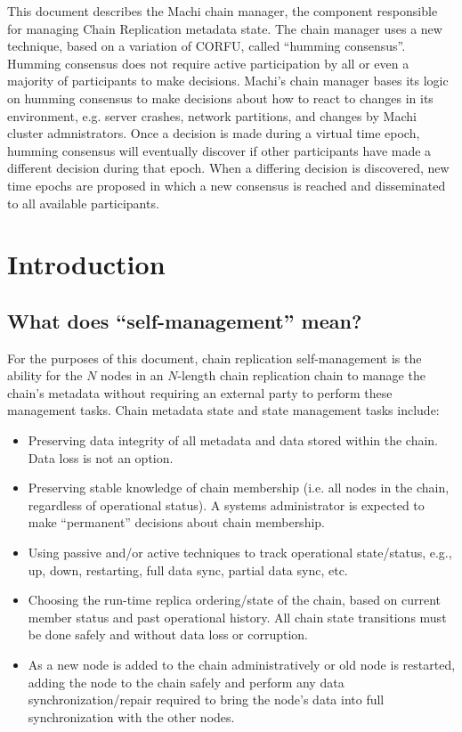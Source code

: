 \documentclass[preprint,10pt]{sigplanconf}
\begin{document}
This document describes the Machi chain manager, the component
responsible for managing Chain Replication metadata state.  The chain
manager uses a new technique, based on a variation of CORFU, called
``humming consensus''.
Humming consensus does not require active participation by all or even
a majority of participants to make decisions.  Machi's chain manager
bases its logic on humming consensus to make decisions about how to
react to changes in its environment, e.g. server crashes, network
partitions, and changes by Machi cluster admnistrators.  Once a
decision is made during a virtual time epoch, humming consensus will
eventually discover if other participants have made a different
decision during that epoch.  When a differing decision is discovered,
new time epochs are proposed in which a new consensus is reached and
disseminated to all available participants.

\section{Introduction}
\label{sec:introduction}

\subsection{What does ``self-management'' mean?}
\label{sub:self-management}

For the purposes of this document, chain replication self-management
is the ability for the $N$ nodes in an $N$-length chain replication chain
to manage the chain's metadata without requiring an external party
to perform these management tasks.  Chain metadata state and state
management tasks include:

\begin{itemize}
\item Preserving data integrity of all metadata and data stored within
  the chain.  Data loss is not an option.
\item Preserving stable knowledge of chain membership (i.e. all nodes in
   the chain, regardless of operational status). A systems
   administrator is expected to make ``permanent'' decisions about
   chain membership.
\item Using passive and/or active techniques to track operational
   state/status, e.g., up, down, restarting, full data sync, partial
   data sync, etc.
\item Choosing the run-time replica ordering/state of the chain, based on
   current member status and past operational history.  All chain
   state transitions must be done safely and without data loss or
   corruption.
\item As a new node is added to the chain administratively or old node is
   restarted, adding the node to the chain safely and perform any data
   synchronization/repair required to bring the node's data into
   full synchronization with the other nodes.
\end{itemize}
\end{document}
